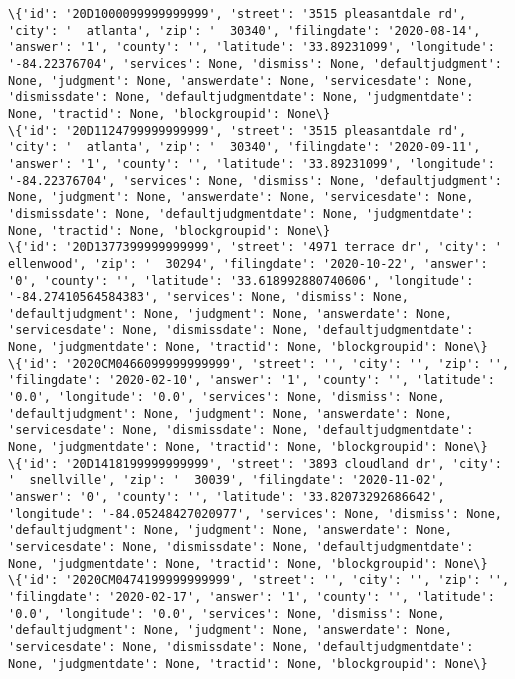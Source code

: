 \documentclass[11pt]{article}
\begin{document}
\begin{Verbatim}[commandchars=\\\{\}]
\{'id': '20D1000099999999999', 'street': '3515 pleasantdale rd', 'city': '  atlanta', 'zip': '  30340', 'filingdate': '2020-08-14', 'answer': '1', 'county': '', 'latitude': '33.89231099', 'longitude': '-84.22376704', 'services': None, 'dismiss': None, 'defaultjudgment': None, 'judgment': None, 'answerdate': None, 'servicesdate': None, 'dismissdate': None, 'defaultjudgmentdate': None, 'judgmentdate': None, 'tractid': None, 'blockgroupid': None\}
\{'id': '20D1124799999999999', 'street': '3515 pleasantdale rd', 'city': '  atlanta', 'zip': '  30340', 'filingdate': '2020-09-11', 'answer': '1', 'county': '', 'latitude': '33.89231099', 'longitude': '-84.22376704', 'services': None, 'dismiss': None, 'defaultjudgment': None, 'judgment': None, 'answerdate': None, 'servicesdate': None, 'dismissdate': None, 'defaultjudgmentdate': None, 'judgmentdate': None, 'tractid': None, 'blockgroupid': None\}
\{'id': '20D1377399999999999', 'street': '4971 terrace dr', 'city': '  ellenwood', 'zip': '  30294', 'filingdate': '2020-10-22', 'answer': '0', 'county': '', 'latitude': '33.618992880740606', 'longitude': '-84.27410564584383', 'services': None, 'dismiss': None, 'defaultjudgment': None, 'judgment': None, 'answerdate': None, 'servicesdate': None, 'dismissdate': None, 'defaultjudgmentdate': None, 'judgmentdate': None, 'tractid': None, 'blockgroupid': None\}
\{'id': '2020CM0466099999999999', 'street': '', 'city': '', 'zip': '', 'filingdate': '2020-02-10', 'answer': '1', 'county': '', 'latitude': '0.0', 'longitude': '0.0', 'services': None, 'dismiss': None, 'defaultjudgment': None, 'judgment': None, 'answerdate': None, 'servicesdate': None, 'dismissdate': None, 'defaultjudgmentdate': None, 'judgmentdate': None, 'tractid': None, 'blockgroupid': None\}
\{'id': '20D1418199999999999', 'street': '3893 cloudland dr', 'city': '  snellville', 'zip': '  30039', 'filingdate': '2020-11-02', 'answer': '0', 'county': '', 'latitude': '33.82073292686642', 'longitude': '-84.05248427020977', 'services': None, 'dismiss': None, 'defaultjudgment': None, 'judgment': None, 'answerdate': None, 'servicesdate': None, 'dismissdate': None, 'defaultjudgmentdate': None, 'judgmentdate': None, 'tractid': None, 'blockgroupid': None\}
\{'id': '2020CM0474199999999999', 'street': '', 'city': '', 'zip': '', 'filingdate': '2020-02-17', 'answer': '1', 'county': '', 'latitude': '0.0', 'longitude': '0.0', 'services': None, 'dismiss': None, 'defaultjudgment': None, 'judgment': None, 'answerdate': None, 'servicesdate': None, 'dismissdate': None, 'defaultjudgmentdate': None, 'judgmentdate': None, 'tractid': None, 'blockgroupid': None\}

\end{Verbatim}
\end{document}
